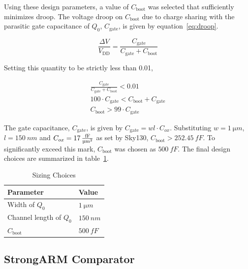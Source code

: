\documentclass[12pt, a4paper]{article}
\begin{document}
Using these design parameters, a value of $C_\mathrm{boot}$ was selected that sufficiently minimizes droop. 
The voltage droop on $C_\mathrm{boot}$ due to charge sharing with the parasitic gate capacitance of $Q_0$, $C_\mathrm{gate}$, is given by equation~\ref{eq:droop}.

\begin{equation}
    \frac{\Delta V}{V_\mathrm{DD}} = \frac{C_\mathrm{gate}}{C_\mathrm{gate} + C_\mathrm{boot}} \label{eq:droop}
\end{equation}

Setting this quantity to be strictly less than 0.01,

\begin{gather}
    \frac{C_\mathrm{gate}}{C_\mathrm{gate} + C_\mathrm{boot}} < 0.01 \nonumber \\
    100 \cdot C_\mathrm{gate} < C_\mathrm{boot} + C_\mathrm{gate} \nonumber \\
    \boxed{C_\mathrm{boot} > 99 \cdot C_\mathrm{gate}} \label{eq:c_boot}
\end{gather}

The gate capacitance, $C_\mathrm{gate}$, is given by $C_\mathrm{gate} = wl \cdot C_{ox}$. Substituting $w = \qty{1}{\micro m}$, $l = \qty{150}{nm}$ and $C_{ox} = \qty{17}{\frac{fF}{\micro m^2}}$ as set by Sky130,
$C_\mathrm{boot} > \qty{252.45}{fF}$. To significantly exceed this mark, $C_\mathrm{boot}$ was chosen as $\qty{500}{fF}$. The final design choices are summarized in table~\ref{tab:sizing}.

\begin{table}[H]
    \centering
    \caption{Sizing Choices}
    \label{tab:sizing}
    \begin{tabular}{@{}ll@{}}
        \toprule
        Parameter & Value  \\
        \midrule
        Width of $Q_0$ & $\qty{1}{\micro m}$ \\
        Channel length of $Q_0$ & $\qty{150}{nm}$ \\ 
        $C_\mathrm{boot}$ & $\qty{500}{fF}$ \\
        \bottomrule
    \end{tabular}
\end{table}

\subsection{StrongARM Comparator}
\label{subsection:strongarm_comparator}
\end{document}
